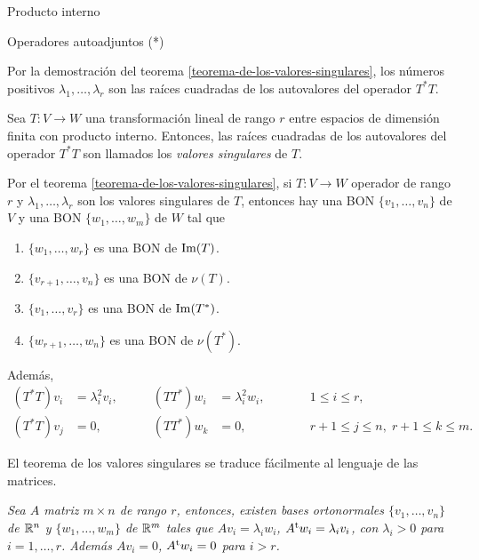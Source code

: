 \begin{chapter}{Producto interno}
\begin{section}{Operadores autoadjuntos (*)}
        \begin{observacion*} Por la demostración del teorema  \ref{teorema-de-los-valores-singulares},  los números positivos $\lambda_1,\ldots,\lambda_r$ son las raíces cuadradas de los autovalores del operador $T^*T$. 
        \end{observacion*}
        
        \begin{definicion}  Sea $T: V \to W$ una transformación lineal de rango $r$ entre espacios de dimensión finita 	con producto interno. Entonces, las raíces cuadradas de los autovalores del operador $T^*T$ son llamados los \textit{valores singulares} de  $T$. 
        \end{definicion}
        
       
        \begin{observacion*}
            Por  el teorema  \ref{teorema-de-los-valores-singulares}, si $T: V \to W$ operador de rango $r$ y $\lambda_1,\ldots,\lambda_r$ son los valores singulares de $T$, entonces
            hay una BON  $\{v_1,\ldots,v_n\}$ de $V$ y una BON $\{w_1,\ldots,w_m\}$ de $W$ tal que
            \begin{enumerate}
                \item $\{w_1,\ldots,w_r \}$ es una BON de  $\operatorname{Im}(T)$.
                \item $\{v_{r+1},\ldots,v_n \}$ es una BON de  $\nu(T)$.
                \item $\{v_1,\ldots,v_r \}$ es una BON de  $\operatorname{Im}(T^*)$.
                \item $\{w_{r+1},\ldots,w_n \}$ es una BON de  $\nu(T^*)$.
            \end{enumerate}
            Además, 
            \begin{align*}
                (T^*T)v_i &= \lambda_i^2 v_i,&\qquad (TT^*)w_i &= \lambda_i^2 w_i,& \qquad &1 \le i \le r, \\
                (T^*T)v_j &= 0,&\qquad (TT^*)w_k &= 0,& \qquad &r+1 \le j \le n,\; r+1 \le k \le m.
            \end{align*}
        \end{observacion*}
        
        \begin{observacion*}
            El teorema de los valores singulares se traduce fácilmente al lenguaje de las matrices.
            
            \textit{Sea $A$ matriz $m \times n$ de rango $r$, entonces, existen bases ortonormales $\{v_1,\ldots,v_n\}$ de $\mathbb R^n$ y $\{w_1,\ldots,w_m\}$ de $\mathbb R^m$ tales que $Av_i = \lambda_i w_i$,  $A^{{\operatorname{t}}}w_i = \lambda_i v_i$, con $\lambda_i >0$ para $i=1,\ldots,r$. Además $Av_i = 0$,  $A^{{\operatorname{t}}}w_i = 0$ para $i > r$. }
            

\end{observacion*}
\end{section}
\end{chapter}
